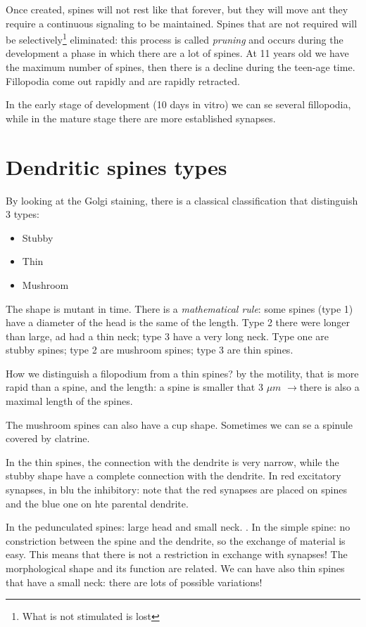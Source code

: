 \documentclass[a4paper, 12pt]{book}
\newcommand{\lfreccia}{\ensuremath{\longrightarrow}}
\begin{document}
Once created, spines will not rest like that forever, but they will move ant they require a continuous signaling to be maintained. Spines that are not required will be selectively\footnote{What is not stimulated is lost} eliminated: this process  is called \emph{pruning} and occurs during the development a phase in which there are a lot of spines. At 11 years old we have the maximum number of spines, then there is a decline during the teen-age time.
Fillopodia come out rapidly and are rapidly retracted. 

In the early stage of development (10 days in vitro) we can se several fillopodia, while in the mature stage there are more established synapses.

\section{Dendritic spines types}
By looking at the Golgi staining, there is a classical classification that distinguish 3 types:
\begin{itemize}
\item{Stubby}
\item{Thin}
\item{Mushroom}
\end{itemize}

The shape is mutant in time. There is a \emph{mathematical rule}: some spines (type 1) have a diameter of the head is the same of the length. Type 2 there were longer than large, ad had a thin neck; type 3 have a very long neck.
Type one are stubby spines;  type 2 are mushroom spines; type 3 are thin spines. 

How we distinguish a filopodium from a thin spines? by the motility, that is more rapid than a spine, and the length: a spine is smaller that 3 $\mu m$ \lfreccia there is also a maximal length of the spines. 

The mushroom spines can also have a cup shape. Sometimes we can se a spinule covered by clatrine.

In the thin spines, the connection with the dendrite is very narrow, while the stubby shape have a complete connection with the dendrite. In red excitatory synapses, in blu the inhibitory: note that the red synapses are placed on spines and the blue one on hte parental dendrite.

In the pedunculated spines: large head and small neck. . In the simple spine: no constriction between the spine and the dendrite, so the exchange of material is easy. This means that there is not a restriction in exchange with synapses! The morphological shape and its function are related. We can have also thin spines that have a small neck: there are lots of possible variations!
\end{document}
